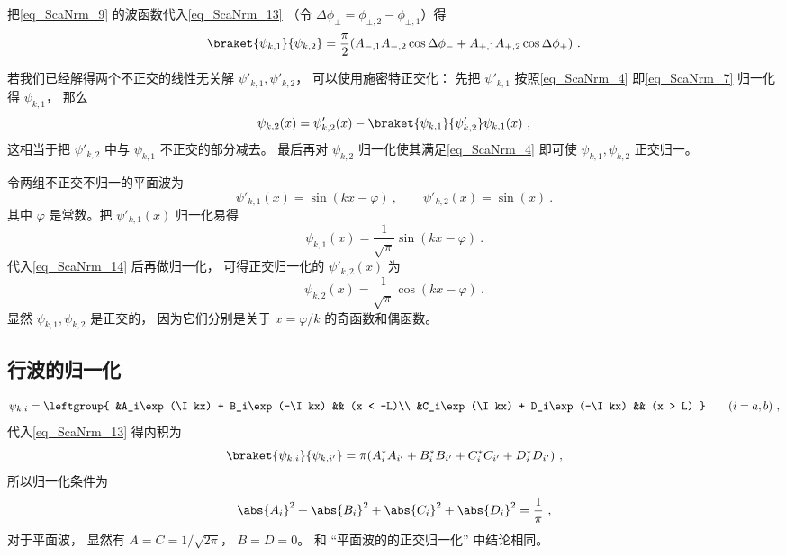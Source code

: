 把\autoref{eq_ScaNrm_9} 的波函数代入\autoref{eq_ScaNrm_13} （令 $\Delta\phi_\pm = \phi_{\pm, 2} - \phi_{\pm, 1}$）得
\begin{equation}
\braket{\psi_{k,1}}{\psi_{k,2}} = \frac{\pi}{2}(A_{-,1}A_{-,2}\cos\Delta\phi_- + A_{+,1}A_{+,2}\cos\Delta\phi_+)~.
\end{equation}


若我们已经解得两个不正交的线性无关解 $\psi'_{k,1}, \psi'_{k,2}$， 可以使用施密特正交化： 先把 $\psi'_{k,1}$ 按照\autoref{eq_ScaNrm_4} 即\autoref{eq_ScaNrm_7} 归一化得 $\psi_{k,1}$， 那么
\begin{equation}\label{eq_ScaNrm_14}
\psi_{k,2}(x) = \psi_{k,2}'(x) - \braket{\psi_{k,1}}{\psi'_{k,2}} \psi_{k,1}(x)~,
\end{equation}
这相当于把 $\psi'_{k,2}$ 中与 $\psi_{k,1}$ 不正交的部分减去。 最后再对 $\psi_{k,2}$ 归一化使其满足\autoref{eq_ScaNrm_4} 即可使 $\psi_{k,1}, \psi_{k,2}$ 正交归一。

\begin{example}{}
令两组不正交不归一的平面波为
\begin{equation}
\psi'_{k,1}(x) = \sin(kx - \varphi)~, \qquad
\psi'_{k,2}(x) = \sin(x)~.
\end{equation}
其中 $\varphi$ 是常数。把 $\psi'_{k,1}(x)$ 归一化易得
\begin{equation}
\psi_{k,1}(x) = \frac{1}{\sqrt{\pi}}\sin(kx - \varphi)~.
\end{equation}
代入\autoref{eq_ScaNrm_14} 后再做归一化， 可得正交归一化的 $\psi'_{k,2}(x)$ 为
\begin{equation}
\psi_{k,2}(x) = \frac{1}{\sqrt{\pi}}\cos(kx - \varphi)~.
\end{equation}
显然 $\psi_{k,1}, \psi_{k,2}$ 是正交的， 因为它们分别是关于 $x = \varphi/k$ 的奇函数和偶函数。
\end{example}

\subsection{行波的归一化}

\begin{equation}
\psi_{k,i} = \leftgroup{
    &A_i\exp(\I kx) + B_i\exp(-\I kx) && (x < -L)\\
    &C_i\exp(\I kx) + D_i\exp(-\I kx) && (x > L)
} \qquad (i = a,b)~,
\end{equation}
代入\autoref{eq_ScaNrm_13} 得内积为
\begin{equation}
\braket{\psi_{k,i}}{\psi_{k,i'}} = \pi (A_i^* A_{i'} + B_i^* B_{i'} + C_i^* C_{i'} + D_i^* D_{i'})~,
\end{equation}
所以归一化条件为
\begin{equation}
\abs{A_i}^2 + \abs{B_i}^2 + \abs{C_i}^2 + \abs{D_i}^2= \frac{1}{\pi}~,
\end{equation}
对于平面波， 显然有 $A = C = 1/\sqrt{2\pi}$， $B = D = 0$。 和 “平面波的的正交归一化” 中结论相同。

